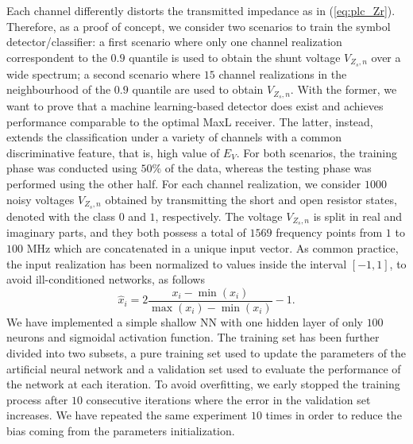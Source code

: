 Each channel differently distorts the transmitted impedance as in (\ref{eq:plc_Zr}). Therefore, as a proof of concept, we consider two scenarios to train the symbol detector/classifier: a first scenario where only one channel realization correspondent to the $0.9$ quantile is used to obtain the shunt voltage $V_{Z_s,n}$ over a wide spectrum; a second scenario where $15$ channel realizations in the neighbourhood of the $0.9$ quantile are used to obtain $V_{Z_s,n}$. With the former, we want to prove that a machine learning-based detector does exist and achieves performance comparable to the optimal MaxL receiver. The latter, instead, extends the classification under a variety of channels with a common discriminative feature, that is, high value of $E_V$. For both scenarios, the training phase was conducted using $50\%$ of the data, whereas the testing phase was performed using the other half. For each channel realization, we consider $1000$ noisy voltages $V_{Z_s,n}$ obtained by transmitting the short and open resistor states, denoted with the class $0$ and $1$, respectively. The voltage $V_{Z_s,n}$ is split in real and imaginary parts, and they both possess a total of $1569$ frequency points from $1$ to $100$ MHz which are concatenated in a unique input vector. As common practice, the input realization has been normalized to values inside the interval $[-1,1]$, to avoid ill-conditioned networks, as follows
\begin{equation}
\label{eq:plc_normalization}
\hat{x}_i = 2\frac{x_i-\min(x_i)}{\max(x_i)-\min(x_i)}-1.
\end{equation}
We have implemented a simple shallow NN with one hidden layer of only $100$ neurons and sigmoidal activation function. The training set has been further divided into two subsets, a pure training set used to update the parameters of the artificial neural network and a validation set used to evaluate the performance of the network at each iteration. To avoid overfitting, we early stopped the training process after $10$ consecutive iterations where the error in the validation set increases. We have repeated the same experiment $10$ times in order to reduce the bias coming from the parameters initialization.

